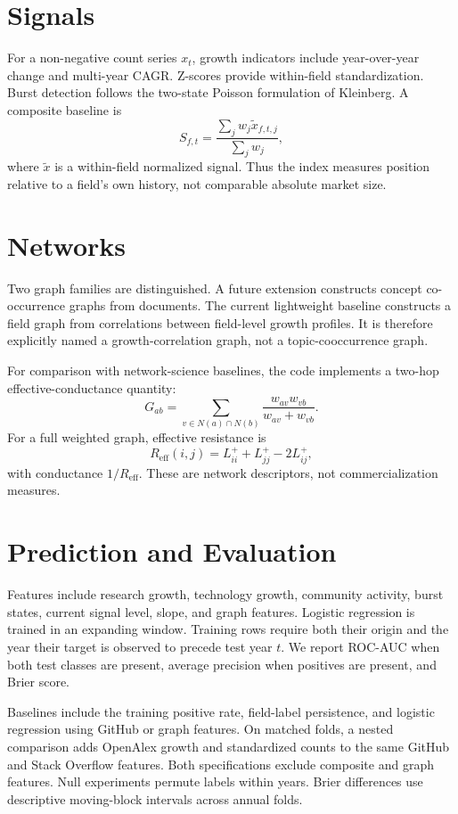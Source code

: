 \documentclass[11pt]{article}
\begin{document}
\section{Signals}
For a non-negative count series $x_t$, growth indicators include year-over-year change and multi-year CAGR. Z-scores provide within-field standardization. Burst detection follows the two-state Poisson formulation of Kleinberg. A composite baseline is
\begin{equation}
S_{f,t}=\frac{\sum_j w_j\tilde{x}_{f,t,j}}{\sum_j w_j},
\end{equation}
where $\tilde{x}$ is a within-field normalized signal. Thus the index measures position relative to a field's own history, not comparable absolute market size.
\section{Networks}
Two graph families are distinguished. A future extension constructs concept co-occurrence graphs from documents. The current lightweight baseline constructs a field graph from correlations between field-level growth profiles. It is therefore explicitly named a growth-correlation graph, not a topic-cooccurrence graph.

For comparison with network-science baselines, the code implements a two-hop effective-conductance quantity:
\begin{equation}
G_{ab}=\sum_{v\in N(a)\cap N(b)}\frac{w_{av}w_{vb}}{w_{av}+w_{vb}}.
\end{equation}
For a full weighted graph, effective resistance is
\begin{equation}
R_{\mathrm{eff}}(i,j)=L^+_{ii}+L^+_{jj}-2L^+_{ij},
\end{equation}
with conductance $1/R_{\mathrm{eff}}$. These are network descriptors, not commercialization measures.
\section{Prediction and Evaluation}
Features include research growth, technology growth, community activity, burst states, current signal level, slope, and graph features. Logistic regression is trained in an expanding window. Training rows require both their origin and the year their target is observed to precede test year $t$. We report ROC-AUC when both test classes are present, average precision when positives are present, and Brier score.

Baselines include the training positive rate, field-label persistence, and logistic regression using GitHub or graph features. On matched folds, a nested comparison adds OpenAlex growth and standardized counts to the same GitHub and Stack Overflow features. Both specifications exclude composite and graph features. Null experiments permute labels within years. Brier differences use descriptive moving-block intervals across annual folds.
\end{document}
